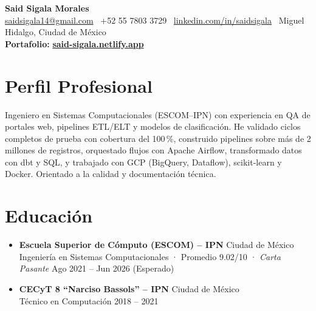 \documentclass[a4paper,10pt]{article}
\begin{document}
\begin{center}
  {\Huge\bfseries Said Sigala Morales}\\[4pt]
  \small
  \href{mailto:saidsigala14@gmail.com}{saidsigala14@gmail.com}
  \textperiodcentered\ +52 55 7803 3729
  \textperiodcentered\ \href{https://www.linkedin.com/in/saidsigala}{linkedin.com/in/saidsigala}
  \textperiodcentered\ Miguel Hidalgo, Ciudad de M\'{e}xico\\[3pt]
  {\normalsize\bfseries Portafolio:}\;
  \href{https://said-sigala.netlify.app/}{\large\textbf{said-sigala.netlify.app}}
\end{center}

\section{Perfil Profesional}

Ingeniero en Sistemas Computacionales (ESCOM--IPN) con experiencia en QA de portales web,
pipelines ETL/ELT y modelos de clasificaci\'{o}n. He validado ciclos completos de prueba con
cobertura del 100\,\%, construido pipelines sobre m\'{a}s de 2 millones de registros, orquestado
flujos con Apache Airflow, transformado datos con dbt y SQL, y trabajado con GCP
(BigQuery, Dataflow), scikit-learn y Docker. Orientado a la calidad y documentaci\'{o}n t\'{e}cnica.

\section{Educaci\'{o}n}

\begin{itemize}
  \item \textbf{Escuela Superior de C\'{o}mputo (ESCOM) -- IPN} \hfill Ciudad de M\'{e}xico\\
        Ingenier\'{i}a en Sistemas Computacionales · Promedio 9.02/10 · \textit{Carta Pasante}
        \hfill Ago 2021 -- Jun 2026 (Esperado)
  \item \textbf{CECyT 8 ``Narciso Bassols'' -- IPN} \hfill Ciudad de M\'{e}xico\\
        T\'{e}cnico en Computaci\'{o}n \hfill 2018 -- 2021
\end{itemize}

\end{document}
